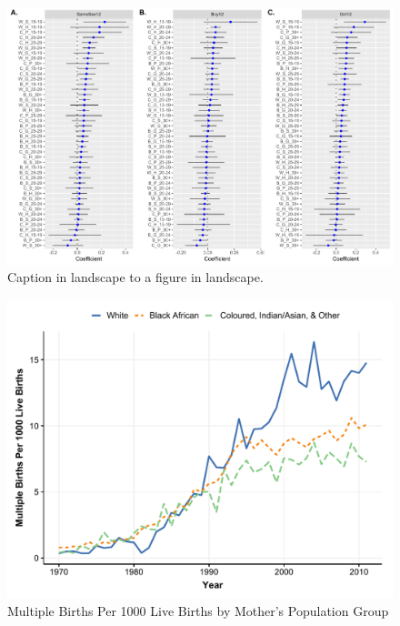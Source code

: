 \documentclass[11pt,a4paper]{article}
\begin{document}
\begin{figure}
\centering
\caption{\label{fig:02}Caption in landscape to a figure in landscape.}
\includegraphics[width=\textwidth]{figures/monot.pdf}
\end{figure}

\begin{figure}[h!]
\centering
\caption{\label{fig:03}Multiple Births Per 1000 Live Births by Mother's Population Group}
\includegraphics[width=\textwidth]{figures/line_pp.pdf}
\end{figure}
\end{document}
